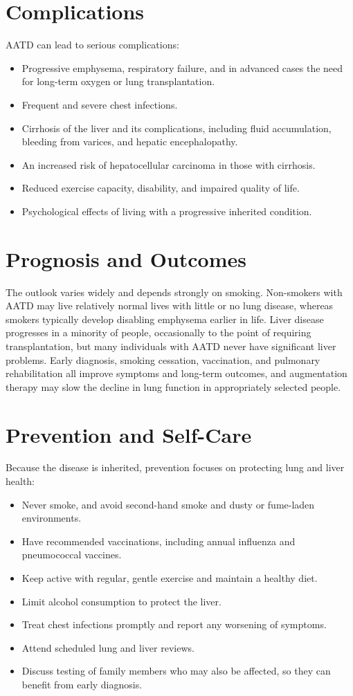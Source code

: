 \section*{Complications}
AATD can lead to serious complications:

\begin{itemize}
    \item Progressive emphysema, respiratory failure, and in advanced cases the need for long-term oxygen or lung transplantation.
    \item Frequent and severe chest infections.
    \item Cirrhosis of the liver and its complications, including fluid accumulation, bleeding from varices, and hepatic encephalopathy.
    \item An increased risk of hepatocellular carcinoma in those with cirrhosis.
    \item Reduced exercise capacity, disability, and impaired quality of life.
    \item Psychological effects of living with a progressive inherited condition.
\end{itemize}

\section*{Prognosis and Outcomes}
The outlook varies widely and depends strongly on smoking. Non-smokers with AATD may live relatively normal lives with little or no lung disease, whereas smokers typically develop disabling emphysema earlier in life. Liver disease progresses in a minority of people, occasionally to the point of requiring transplantation, but many individuals with AATD never have significant liver problems. Early diagnosis, smoking cessation, vaccination, and pulmonary rehabilitation all improve symptoms and long-term outcomes, and augmentation therapy may slow the decline in lung function in appropriately selected people.

\section*{Prevention and Self-Care}
Because the disease is inherited, prevention focuses on protecting lung and liver health:

\begin{itemize}
    \item Never smoke, and avoid second-hand smoke and dusty or fume-laden environments.
    \item Have recommended vaccinations, including annual influenza and pneumococcal vaccines.
    \item Keep active with regular, gentle exercise and maintain a healthy diet.
    \item Limit alcohol consumption to protect the liver.
    \item Treat chest infections promptly and report any worsening of symptoms.
    \item Attend scheduled lung and liver reviews.
    \item Discuss testing of family members who may also be affected, so they can benefit from early diagnosis.
\end{itemize}

